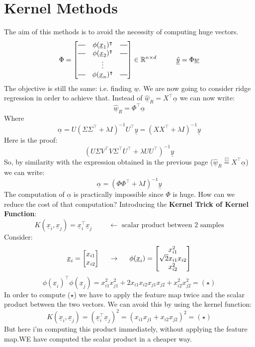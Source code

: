 \section{Kernel Methods}
The aim of this methods is to avoid the necessity of computing huge vectors.
\[
    \Phi =  \begin{bmatrix}
        \horzbar & \phi(\underline{x}_1)^\intercal & \horzbar\\
        \horzbar & \phi(\underline{x}_2)^\intercal & \horzbar\\    
         & \vdots & \\
        \horzbar & \phi(\underline{x}_n)^\intercal & \horzbar
    \end{bmatrix}
    \in \mathbb{R}^{n \times d} \hspace{1cm} \underline{\hat{y}} = \Phi \underline{w}
\]
The objective is still the same: i.e. finding $\underline{w}$. We are now going to consider ridge regression in order to achieve that. 
Instead of $\underline{\hat{w}}_R = X^\intercal \underline{\alpha}$ we can now write:
\[
    \underline{\hat{w}}_R = \Phi^\intercal \underline{\alpha}
\]
Where
\[
    \underline{\alpha} = U(\Sigma \Sigma^\intercal + \lambda I)^{-1} U^\intercal \underline{y} = (XX^\intercal + \lambda I)^{-1} \underline{y}    
\]
Here is the proof:
\[
    (U\Sigma V^\intercal V\Sigma^\intercal U^\intercal + \lambda UU^\intercal)^{-1} \underline{y}    
\]
So, by similarity with the expression obtained in the previous page ($\underline{\hat{w}}_R \overset{\boxdot}{=} X^\intercal \underline{\alpha}$) we can write:
\[
    \underline{\alpha} = (\Phi\Phi^\intercal + \lambda I)^{-1} \underline{y}    
\]
The computation of $\underline{\alpha}$ is practically impossible since $\Phi$ is huge. How can we reduce the cost of that computation? Introducing the \textbf{Kernel Trick of Kernel Function}:
\[
    K(\underline{x}_i, \underline{x}_j) = \underline{x}_i^\intercal \underline{x}_j \hspace{1cm} \leftarrow \text{ scalar product between 2 samples}
\]
Consider:
\[
\underline{x}_i = 
\begin{bmatrix}
    x_{i1}\\
    x_{i2}
\end{bmatrix}
\hspace{0.5cm} \rightarrow \hspace{0.5cm}
\phi(\underline{x}_i) =
\begin{bmatrix}
    x_{i1}^2\\
    \sqrt{2} x_{i1}x_{i2}\\
    x_{i2}^2\\
\end{bmatrix}    
\]
\[
    \phi(\underline{x}_i)^\intercal \phi(\underline{x}_j) = x_{i1}^2x_{j1}^2 + 2x_{i1}x_{i2}x_{j1}x_{j2} + x_{i2}^2x_{j2}^2 = (\star)
\]
In order to compute ($\star$) we have to apply the feature map twice and the scalar product between the two vectors. We can avoid this by using the kernel function:
\[
    K(\underline{x}_i, \underline{x}_j) = (\underline{x}_i^\intercal \underline{x}_j)^2 = (x_{i1}x_{j1} + x_{i2}x_{j2})^2 = (\star)    
\]
But here i'm computing this product immediately, without applying the feature map.WE have computed the scalar product in a cheaper way.

